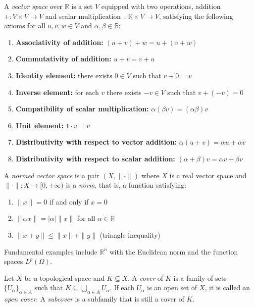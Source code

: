 \begin{definition}\label{def:espacio_vectorial}
	A \textit{vector space} over $\mathbb{R}$ is a set $V$ equipped with two operations, addition $+: V \times V \to V$ and scalar multiplication $\cdot: \mathbb{R} \times V \to V$, satisfying the following axioms for all $u, v, w \in V$ and $\alpha, \beta \in \mathbb{R}$:
	\begin{enumerate}
		\item \textbf{Associativity of addition:} $(u + v) + w = u + (v + w)$
		\item \textbf{Commutativity of addition:} $u + v = v + u$
		\item \textbf{Identity element:} there exists $0 \in V$ such that $v + 0 = v$
		\item \textbf{Inverse element:} for each $v$ there exists $-v \in V$ such that $v + (-v) = 0$
		\item \textbf{Compatibility of scalar multiplication:} $\alpha(\beta v) = (\alpha\beta)v$
		\item \textbf{Unit element:} $1 \cdot v = v$
		\item \textbf{Distributivity with respect to vector addition:} $\alpha(u + v) = \alpha u + \alpha v$
		\item \textbf{Distributivity with respect to scalar addition:} $(\alpha + \beta)v = \alpha v + \beta v$
	\end{enumerate}
\end{definition}

\begin{definition}\label{def:espacio_normado}
	A \textit{normed vector space} is a pair $(X, \|\cdot\|)$ where $X$ is a real vector space and $\|\cdot\|: X \to [0, +\infty)$ is a \textit{norm}, that is, a function satisfying:
	\begin{enumerate}
		\item $\|x\| = 0$ if and only if $x = 0$
		\item $\|\alpha x\| = |\alpha| \|x\|$ for all $\alpha \in \mathbb{R}$
		\item $\|x + y\| \leq \|x\| + \|y\|$ (triangle inequality)
	\end{enumerate}
\end{definition}

Fundamental examples include $\mathbb{R}^n$ with the Euclidean norm and the function spaces $L^p(\Omega)$.

\begin{definition}[Cover]\label{def:recubrimiento}
	Let $X$ be a topological space and $K \subseteq X$. A \textit{cover} of $K$ is a family of sets $\{U_\alpha\}_{\alpha \in A}$ such that $K \subseteq \bigcup_{\alpha \in A} U_\alpha$. If each $U_\alpha$ is an open set of $X$, it is called an \textit{open cover}. A \textit{subcover} is a subfamily that is still a cover of $K$.
\end{definition}

